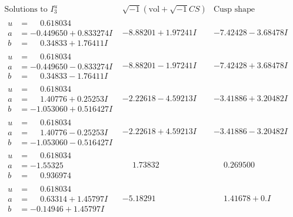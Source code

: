 \documentclass[1p]{elsarticle_modified}
\theoremstyle{definition}
\newcommand{\I}{\sqrt{-1}}
\begin{document}
$$\begin{array}{c|c|c}  
\text{Solutions to }I^u_{3}& \I (\text{vol} + \sqrt{-1}CS) & \text{Cusp shape}\\
 \hline 
\begin{aligned}
u &= \phantom{-}0.618034\phantom{ +0.000000I} \\
a &= -0.449650 + 0.833274 I \\
b &= \phantom{-}0.34833 + 1.76411 I\end{aligned}
 & -8.88201 + 1.97241 I & -7.42428 - 3.68478 I \\ \hline\begin{aligned}
u &= \phantom{-}0.618034\phantom{ +0.000000I} \\
a &= -0.449650 - 0.833274 I \\
b &= \phantom{-}0.34833 - 1.76411 I\end{aligned}
 & -8.88201 - 1.97241 I & -7.42428 + 3.68478 I \\ \hline\begin{aligned}
u &= \phantom{-}0.618034\phantom{ +0.000000I} \\
a &= \phantom{-}1.40776 + 0.25253 I \\
b &= -1.053060 + 0.516427 I\end{aligned}
 & -2.22618 - 4.59213 I & -3.41886 + 3.20482 I \\ \hline\begin{aligned}
u &= \phantom{-}0.618034\phantom{ +0.000000I} \\
a &= \phantom{-}1.40776 - 0.25253 I \\
b &= -1.053060 - 0.516427 I\end{aligned}
 & -2.22618 + 4.59213 I & -3.41886 - 3.20482 I \\ \hline\begin{aligned}
u &= \phantom{-}0.618034\phantom{ +0.000000I} \\
a &= -1.55325\phantom{ +0.000000I} \\
b &= \phantom{-}0.936974\phantom{ +0.000000I}\end{aligned}
 & \phantom{-}1.73832\phantom{ +0.000000I} & \phantom{-}0.269500\phantom{ +0.000000I} \\ \hline\begin{aligned}
u &= \phantom{-}0.618034\phantom{ +0.000000I} \\
a &= \phantom{-}0.63314 + 1.45797 I \\
b &= -0.14946 + 1.45797 I\end{aligned}
 & -5.18291\phantom{ +0.000000I} & \phantom{-}1.41678 + 0. I\phantom{ +0.000000I} \\ \hline\begin{aligned}

\end{aligned}
\end{array}$$
\end{document}
